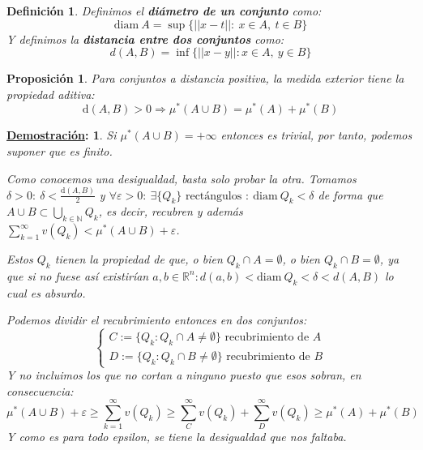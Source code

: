 \documentclass[10pt,a4paper,openright]{book}
\theoremstyle{break}
\newtheorem*{defi}{Definición}
\newtheorem*{prop}{Proposición}
\newtheorem*{demo}{\underline{Demostración}:}
\begin{document}
\begin{defi}
Definimos el \textbf{diámetro de un conjunto} como:
$$\mathrm{diam}\ A = \sup \{\vert \vert x - t \vert  \vert: \ x \in A, \ t \in B \}$$
Y definimos la \textbf{distancia entre dos conjuntos} como:
$$d(A,B) = \inf \{||x-y||: x\in A, \ y \in B\}$$
\end{defi}

\begin{prop}
Para conjuntos a distancia positiva, la medida exterior tiene la propiedad aditiva:
$$\mathrm{d}\left( A, B \right) > 0 \Rightarrow \mu^*\left( A \cup B \right) = \mu^*\left( A \right) + \mu^*\left( B \right)$$
\end{prop}
\begin{demo}
Si $ \mu^*\left( A\cup B \right) = +\infty$ entonces es trivial, por tanto, podemos suponer que es finito.

Como conocemos una desigualdad, basta solo probar la otra. Tomamos $\delta > 0: \ \delta < \frac{\mathrm{d}\left( A, B \right)}{2}$ y $\forall \varepsilon > 0: \ \exists \{Q_k\} \text{ rectángulos }: \ \mathrm{diam}\ Q_k < \delta$ de forma que $A\cup B \subset \bigcup_{k \in \mathbb{N}} Q_k$, es decir, recubren y además $\sum_{k=1}^{\infty} v\left( Q_k \right) < \mu^*\left( A\cup B \right) + \varepsilon $.

Estos $Q_k$ tienen la propiedad de que, o bien $Q_k \cap A = \emptyset$, o bien $Q_k \cap B = \emptyset$, ya que si no fuese así existirían $a,b\in \mathbb{R}^n: d(a,b) < \mathrm{diam} \ Q_k < \delta < d(A,B)$ lo cual es absurdo. 

Podemos dividir el recubrimiento entonces en dos conjuntos:
$$ \begin{cases}
C:= \{Q_k : Q_k \cap A \neq \emptyset\} \text{ recubrimiento de } A \\
D:= \{Q_k : Q_k \cap B \neq \emptyset\} \text{ recubrimiento de } B
\end{cases}$$
Y no incluimos los que no cortan a ninguno puesto que esos sobran, en consecuencia:
$$\mu^*(A\cup B) +\varepsilon \geq \sum_{k=1}^{\infty} v\left( Q_k \right) \geq \sum_{C}^{\infty} v\left( Q_k \right) + \sum_{D}^{\infty} v\left( Q_k \right) \geq \mu^*\left( A \right) + \mu^*\left( B \right)$$
Y como es para todo epsilon, se tiene la desigualdad que nos faltaba.
\end{demo}
\end{document}
